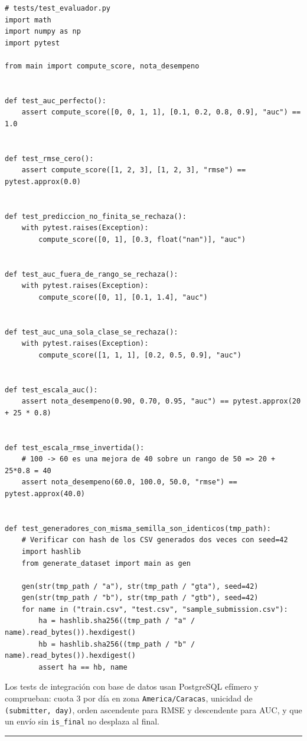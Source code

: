\documentclass[11pt,a4paper]{article}
\begin{document}
\begin{lstlisting}
# tests/test_evaluador.py
import math
import numpy as np
import pytest

from main import compute_score, nota_desempeno


def test_auc_perfecto():
    assert compute_score([0, 0, 1, 1], [0.1, 0.2, 0.8, 0.9], "auc") == 1.0


def test_rmse_cero():
    assert compute_score([1, 2, 3], [1, 2, 3], "rmse") == pytest.approx(0.0)


def test_prediccion_no_finita_se_rechaza():
    with pytest.raises(Exception):
        compute_score([0, 1], [0.3, float("nan")], "auc")


def test_auc_fuera_de_rango_se_rechaza():
    with pytest.raises(Exception):
        compute_score([0, 1], [0.1, 1.4], "auc")


def test_auc_una_sola_clase_se_rechaza():
    with pytest.raises(Exception):
        compute_score([1, 1, 1], [0.2, 0.5, 0.9], "auc")


def test_escala_auc():
    assert nota_desempeno(0.90, 0.70, 0.95, "auc") == pytest.approx(20 + 25 * 0.8)


def test_escala_rmse_invertida():
    # 100 -> 60 es una mejora de 40 sobre un rango de 50 => 20 + 25*0.8 = 40
    assert nota_desempeno(60.0, 100.0, 50.0, "rmse") == pytest.approx(40.0)


def test_generadores_con_misma_semilla_son_identicos(tmp_path):
    # Verificar con hash de los CSV generados dos veces con seed=42
    import hashlib
    from generate_dataset import main as gen

    gen(str(tmp_path / "a"), str(tmp_path / "gta"), seed=42)
    gen(str(tmp_path / "b"), str(tmp_path / "gtb"), seed=42)
    for name in ("train.csv", "test.csv", "sample_submission.csv"):
        ha = hashlib.sha256((tmp_path / "a" / name).read_bytes()).hexdigest()
        hb = hashlib.sha256((tmp_path / "b" / name).read_bytes()).hexdigest()
        assert ha == hb, name
\end{lstlisting}

Los tests de integración con base de datos usan PostgreSQL efímero y comprueban: cuota 3 por día en zona \texttt{America/\allowbreak{}Caracas}, unicidad de \texttt{(submitter,\ day)}, orden ascendente para RMSE y descendente para AUC, y que un envío sin \texttt{is\_\allowbreak{}final} no desplaza al final.

\begin{center}\rule{0.5\linewidth}{0.5pt}\end{center}
\end{document}
